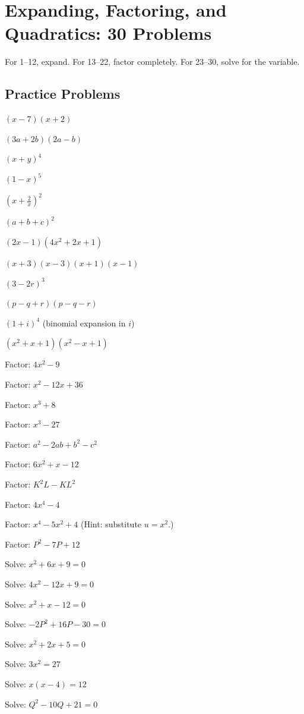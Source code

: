 \chapter{Expanding, Factoring, and Quadratics: 30 Problems}

For 1--12, expand. For 13--22, factor completely. For 23--30, solve for
the variable.

\section{Practice Problems}

\begin{problems}
  \item $(x-7)(x+2)$
  \item $(3a+2b)(2a-b)$
  \item $(x+y)^{4}$
  \item $(1-x)^{5}$
  \item $\displaystyle\left(x+\frac{2}{x}\right)^{2}$
  \item $(a+b+c)^{2}$
  \item $(2x-1)(4x^{2}+2x+1)$
  \item $(x+3)(x-3)(x+1)(x-1)$
  \item $(3-2r)^{3}$
  \item $(p-q+r)(p-q-r)$
  \item $(1+i)^{4}$ (binomial expansion in $i$)
  \item $(x^{2}+x+1)(x^{2}-x+1)$
  \item Factor: $4x^{2}-9$
  \item Factor: $x^{2}-12x+36$
  \item Factor: $x^{3}+8$
  \item Factor: $x^{3}-27$
  \item Factor: $a^{2}-2ab+b^{2}-c^{2}$
  \item Factor: $6x^{2}+x-12$
  \item Factor: $K^{2}L-KL^{2}$
  \item Factor: $4x^{4}-4$
  \item Factor: $x^{4}-5x^{2}+4$ (Hint: substitute $u=x^{2}$.)
  \item Factor: $P^{2}-7P+12$
  \item Solve: $x^{2}+6x+9=0$
  \item Solve: $4x^{2}-12x+9=0$
  \item Solve: $x^{2}+x-12=0$
  \item Solve: $-2P^{2}+16P-30=0$
  \item Solve: $x^{2}+2x+5=0$
  \item Solve: $3x^{2}=27$
  \item Solve: $x(x-4)=12$
  \item Solve: $Q^{2}-10Q+21=0$
\end{problems}

